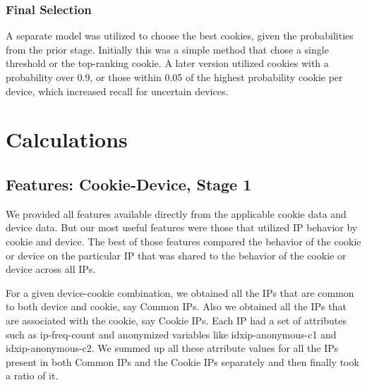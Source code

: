 \documentclass[9pt, journal]{IEEEtran}
\begin{document}
\subsubsection{Final Selection}
A separate model was utilized to choose the best cookies, given the probabilities from the prior stage. 
Initially this was a simple method that chose a single threshold or the top-ranking cookie. 
A later version utilized cookies with a probability over 0.9, or those within 0.05 of the highest probability cookie per device, which increased recall for uncertain devices.


\section{Calculations}
\subsection{Features: Cookie-Device, Stage 1}
We provided all features available directly from the applicable cookie data and device data.
But our most useful features were those that utilized IP behavior by cookie and device.
The best of those features compared the behavior of the cookie or device on the particular IP that was shared to the behavior of the cookie or device across all IPs.

For a given device-cookie combination, we obtained all the IPs that are common to both device and cookie, say Common IPs. 
Also we obtained all the IPs that are associated with the cookie, say Cookie IPs. 
Each IP had a set of attributes such as ip-freq-count and anonymized variables like idxip-anonymous-c1 and idxip-anonymous-c2. 
We summed up all these atrribute values for all the IPs present in both Common IPs and the Cookie IPs separately and then finally took a ratio of it.
\end{document}
